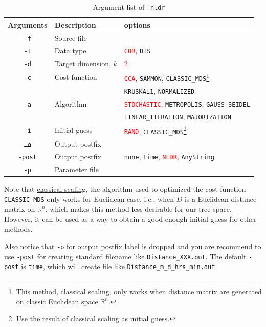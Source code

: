 \documentclass[11pt,a4paper]{article}
\theoremstyle{definition}
\theoremstyle{definition}
\numberwithin{equation}{section}
\begin{document}
	\begin{table}[!h]
		\centering
		\begin{tabular}{cll}
			\hline
			Arguments & Description & options\\
			\hline
			\texttt{-f}& Source file &  \\
			\hline
			\texttt{-t}& Data type & \textcolor{red}{\texttt{COR}}, \texttt{DIS}\\
			\hline
			\texttt{-d}& Target dimension, $k$& \textcolor{red}{2}\\
			\hline
			\texttt{-c}& Cost function& \textcolor{red}{\texttt{CCA}}, \texttt{SAMMON}, \texttt{CLASSIC\_MDS}\footnote{This method, classical scaling, only works when distance matrix are generated on classic Euclidean space $\mathbb{R}^n$.}\\
			&&\texttt{KRUSKAL1}, \texttt{NORMALIZED}\\
			\hline
			\texttt{-a}& Algorithm & \textcolor{red}{\texttt{STOCHASTIC}}, \texttt{METROPOLIS}, \texttt{GAUSS\_SEIDEL}\\
			&&\texttt{LINEAR\_ITERATION}, \texttt{MAJORIZATION}\\
			\hline
			\texttt{-i}& Initial guess & \textcolor{red}{\texttt{RAND}}, \texttt{CLASSIC\_MDS}\footnote{Use the result of classical scaling as initial guess.}\\
			\hline
			\texttt{\st{-o}}& \st{Output postfix}&\\
			\hline
			\texttt{-post} & Output postfix&\texttt{none}, \texttt{time}, \textcolor{red}{\texttt{NLDR}}, \texttt{AnyString}\\
			\hline
			\texttt{-p}& Parameter file&\\
			\hline
		\end{tabular}
		\caption{Argument list of \texttt{-nldr}}
		\label{tab:nldrlist}
	\end{table}

	Note that \href{https://en.wikipedia.org/wiki/Multidimensional_scaling}{classical scaling}, the algorithm used to optimized the cost function \texttt{CLASSIC\_MDS} only works for Euclidean case, i.e., when $D$ is a Euclidean distance matrix on $\mathbb{R}^n$, which makes this method less desirable for our tree space. However, it can be used as a way to obtain a good enough initial guess for other methods. 
	
	Also notice that \texttt{-o} for output postfix label is dropped and you are recommend to use \texttt{-post} for creating standard filename like \texttt{Distance\_XXX.out}. The default \texttt{-post} is \texttt{time}, which will create file like \texttt{Distance\_m\_d\_hrs\_min.out}.
	
\end{document}

